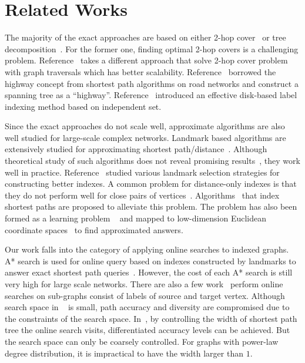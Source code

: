 \section{Related Works}
\label{relatedwork} 

The majority of the exact approaches are based on either 2-hop cover~\cite{Cohen:2002:RDQ:545381.545503,Akiba:2013:FES:2463676.2465315} or tree decomposition~\cite{Akiba:2012:SQC:2247596.2247614,Wei:2010:TES:1807167.1807181}. For the former one, finding optimal 2-hop covers is a challenging problem. Reference~\cite{Akiba:2013:FES:2463676.2465315} takes a different approach that solve 2-hop cover problem with graph traversals which has better scalability. Reference~\cite{Jin:2012:HLA:2213836.2213887} borrowed the highway concept from shortest path algorithms on road networks and construct a spanning tree as a "`highway"'. Reference~\cite{Fu:2013:IIB:2536336.2536346} introduced an effective disk-based label indexing method based on independent set.

Since the exact approaches do not scale well, approximate algorithms are also well studied for large-scale complex networks. Landmark based algorithms are extensively studied for approximating shortest path/distance~\cite{Thorup:2005:ADO:1044731.1044732,Goldberg:2005:CSP:1070432.1070455,Potamias:2009:FSP:1645953.1646063,floreskul2014memory,Maier:2011:INS:1993077.1993079, das2010sketch}. Although theoretical study of such algorithms does not reveal promising results~\cite{Thorup:2005:ADO:1044731.1044732}, they work well in practice. Reference~\cite{Potamias:2009:FSP:1645953.1646063,6927522} studied various landmark selection strategies for constructing better indexes. A common problem for distance-only indexes is that they do not perform well for close pairs of vertices~\cite{Akiba:2012:SQC:2247596.2247614}. Algorithms~\cite{Gubichev:2010:FAE:1871437.1871503,tretyakov2011fast,6399472} that index shortest paths are proposed to alleviate this problem. The problem has also been formed as a learning problem ~\cite{7004250} and mapped to low-dimension Euclidean coordinate spaces~\cite{Zhao:2010:OSP:1863190.1863199} to find approximated answers.

Our work falls into the category of applying online searches to indexed graphs. A* search is used for online query based on indexes constructed by landmarks to answer exact shortest path queries~\cite{Goldberg:2005:CSP:1070432.1070455}. However, the cost of each A* search is still very high for large scale networks. There are also a few work~\cite{Gubichev:2010:FAE:1871437.1871503, 6399472} perform online searches on sub-graphs consist of labels of source and target vertex. Although search space in ~\cite{Gubichev:2010:FAE:1871437.1871503} is small, path accuracy and diversity are compromised due to the constraints of the search space. In~\cite{6399472}, by controlling the width of shortest path tree the online search visits, differentiated accuracy levels can be achieved. But the search space can only be coarsely controlled. For graphs with power-law degree distribution, it is impractical to have the width larger than $1$.
